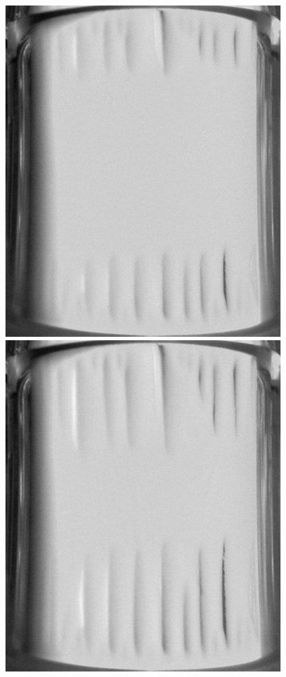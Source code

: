 \documentclass[onecolumn,12pt,tightenlines, a4paper,superscriptaddress,notitlepage]{revtex4-1}
\begin{document}
\begin{center}
\includegraphics[width=\mylena]{Y110_2013-03-01_03-19-47.jpg}\hfill
\includegraphics[width=\mylena]{Y110_2013-03-01_03-21-10.jpg}\hfill

\end{center}
\end{document}
